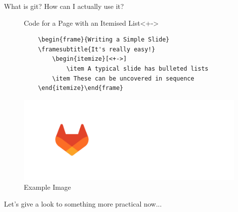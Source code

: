 \begin{frame}{What is git?}
How can I actually use it?

\begin{figure}[htbp]
  \begin{minipage}[t]{0.5\textwidth}
    \begin{block}{Code for a Page with an Itemised List}<+->
    \begin{verbatim}
    \begin{frame}{Writing a Simple Slide}
    \framesubtitle{It's really easy!}
        \begin{itemize}[<+->]
            \item A typical slide has bulleted lists
        \item These can be uncovered in sequence
    \end{itemize}\end{frame}
    \end{verbatim}
\end{block}
  \end{minipage}
  \hfill
  \begin{minipage}[t]{0.4\textwidth}
    \centering
    \includegraphics[width=\linewidth]{assets/gitlab-logo-200.png}
    \caption{Example Image}
    \label{fig:example}
  \end{minipage}
\end{figure}

\vspace{30pt}
Let's give a look to something more practical now...
    
\end{frame}


